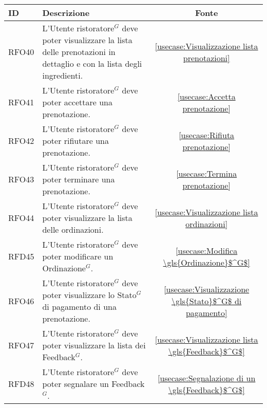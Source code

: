 \begin{table}[H]
	\renewcommand{\arraystretch}{1.5}
	\centering
	\begin{tabularx}{\textwidth}{l|X|c}
		\textbf{ID} & \textbf{Descrizione}                                                                                                    & \textbf{Fonte}                                       \\
		\hline
		RFO40       & L'\gls{Utente ristoratore}$^G$ deve poter visualizzare la lista delle prenotazioni in dettaglio e con la lista degli ingredienti. & \autoref{usecase:Visualizzazione lista prenotazioni} \\
		\hline
		RFO41       & L'\gls{Utente ristoratore}$^G$ deve poter accettare una prenotazione.                                                             & \autoref{usecase:Accetta prenotazione}               \\
		\hline
		RFO42       & L'\gls{Utente ristoratore}$^G$ deve poter rifiutare una prenotazione.                                                             & \autoref{usecase:Rifiuta prenotazione}               \\
		\hline
		RFO43       & L'\gls{Utente ristoratore}$^G$ deve poter terminare una prenotazione.                                                             & \autoref{usecase:Termina prenotazione}               \\
		\hline
		RFO44       & L'\gls{Utente ristoratore}$^G$ deve poter visualizzare la lista delle ordinazioni.                                                & \autoref{usecase:Visualizzazione lista ordinazioni}  \\
		\hline
		RFD45       & L'\gls{Utente ristoratore}$^G$ deve poter modificare un \gls{Ordinazione}$^G$.                                                              & \autoref{usecase:Modifica \gls{Ordinazione}$^G$}               \\
		\hline
		RFO46       & L'\gls{Utente ristoratore}$^G$ deve poter visualizzare lo \gls{Stato}$^G$ di pagamento di una prenotazione.                                 & \autoref{usecase:Visualizzazione \gls{Stato}$^G$ di pagamento} \\
		\hline
		RFO47       & L'\gls{Utente ristoratore}$^G$ deve poter visualizzare la lista dei \gls{Feedback}$^G$.                                                     & \autoref{usecase:Visualizzazione lista \gls{Feedback}$^G$}     \\
		\hline
		RFD48       & L'\gls{Utente ristoratore}$^G$ deve poter segnalare un \gls{Feedback}$^G$.                                                                  & \autoref{usecase:Segnalazione di un \gls{Feedback}$^G$}        \\

\end{tabularx}
\end{table}
